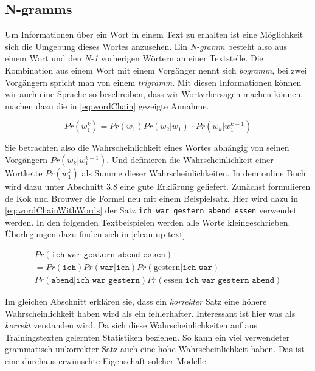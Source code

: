 \subsection{N-gramms}
    \label{sec:n-gramms}
    
    Um Informationen über ein Wort in einem Text zu erhalten ist eine Möglichkeit sich die Umgebung dieses Wortes anzusehen. Ein \emph{N-gramm} besteht also aus einem Wort und den \emph{N-1} vorherigen Wörtern an einer Textstelle. Die Kombination aus einem Wort mit einem Vorgänger nennt sich \emph{bogramm}, bei zwei Vorgängern spricht man von einem \emph{trigramm}. Mit diesen Informationen können wir auch eine Sprache so beschreiben, dass wir Wortvrhersagen machen können. \parencite[S. 468, Gleichung 1]{cumpatationalLinguistics:classBasedNGramms} machen dazu die in \autoref{eq:wordChain} gezeigte Annahme.
        
    \begin{equation}
       	Pr(w_1^k) = Pr(w_1) Pr(w_2|w_1) \cdots Pr(w_k|w_1^{k-1})
       	\label{eq:wordChain}
    \end{equation}
       
    Sie betrachten also die Wahrscheinlichkeit eines Wortes abhängig von seinen Vorgängern \(Pr(w_k|w_1^{k-1})\). Und definieren die Wahrscheinlichkeit einer Wortkette \(Pr(w_1^k)\) als Summe dieser Wahrscheinlichkeiten. In dem online Buch \parencite{nlwp:book} wird dazu unter Abschnitt 3.8 eine gute Erklärung geliefert. Zunächst formulieren de Kok und Brouwer die Formel neu mit einem Beispielsatz. Hier wird dazu in \autoref{eq:wordChainWithWords} der Satz \texttt{ich war gestern abend essen} verwendet werden. In den folgenden Textbeispielen werden alle Worte kleingeschrieben. Überlegungen dazu finden sich in \autoref{clean-up-text} 
        
    \begin{equation}
       	\begin{split}
       		Pr(\texttt{ich war gestern abend essen}) \\
            = Pr(\texttt{ich}) Pr(\texttt{war}|\texttt{ich}) Pr(\text{gestern}|\texttt{ich war}) \\
            Pr(\texttt{abend}|\texttt{ich war gestern}) Pr(\text{essen}|\texttt{ich war gestern abend}) 
        \end{split}
        \label{eq:wordChainWithWords}
    \end{equation}
        
    Im gleichen Abschnitt erklären sie, dass ein \emph{korrekter} Satz eine höhere Wahrscheinlichkeit haben wird als ein fehlerhafter. Interessant ist hier was als \emph{korrekt} verstanden wird. Da sich diese Wahrscheinlichkeiten auf aus Trainingstexten gelernten Statistiken beziehen. So kann ein viel verwendeter grammatisch unkorrekter Satz auch eine hohe Wahrscheinlichkeit haben. Das ist eine durchaus erwünschte Eigenschaft solcher Modelle.
        
